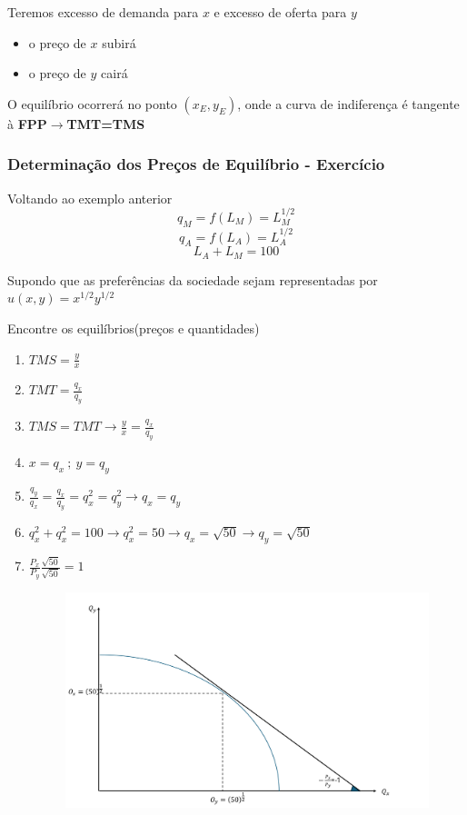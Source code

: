 \documentclass[a4paper,12pt]{article}[abntex2]
\begin{document}
Teremos excesso de demanda para $x$ e excesso de oferta para $y$\begin{itemize}
    \item o preço de $x$ subirá 
    \item o preço de $y$ cairá 
\end{itemize}

O equilíbrio ocorrerá no ponto $(x_E,y_E)$, onde a curva de indiferença é tangente à \textbf{FPP}$\rightarrow$\textbf{TMT=TMS}

\subsubsection{\textbf{Determinação dos Preços de Equilíbrio - Exercício}}

Voltando ao exemplo anterior 
\[
q_M=f(L_M)=L_M^{1/2}
\]
\[
q_A=f(L_A)=L_A^{1/2}
\]
\[
L_A+L_M=100
\]

Supondo que as preferências da sociedade sejam representadas por $u(x,y)=x^{1/2}y^{1/2}$

Encontre os equilíbrios(preços e quantidades)\begin{enumerate}
    \item \(TMS=\frac{y}{x}\)
    \item \(TMT=\frac{q_x}{q_y}\)
    \item \(TMS=TMT\rightarrow \frac{y}{x}=\frac{q_x}{q_y}\)
    \item \(x=q_x \ ; \ y=q_y \)
    \item \(\frac{q_y}{q_x}=\frac{q_x}{q_y}=q_x^2=q_y^2\rightarrow q_x=q_y\)
    \item \(q_x^2+q_x^2=100 \rightarrow q_x^2=50 \rightarrow q_x=\sqrt{50} \rightarrow q_y=\sqrt{50}\)
    \item \(\frac{P_x}{P_y}\frac{\sqrt{50}}{\sqrt{50}}=1\)
    \begin{figure}[H]
        \centering
        \includegraphics[width=0.7\linewidth]{Imagens/a6i1.png}
    \end{figure}
\end{enumerate}
\end{document}
